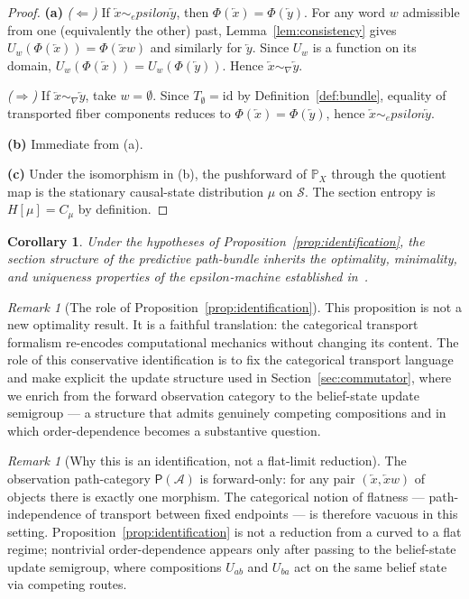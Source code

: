 \documentclass[11pt,a4paper]{article}
\def\varepsilon{epsilon}%
\theoremstyle{plain}
\newtheorem{corollary}[theorem]{Corollary}
\theoremstyle{definition}
\theoremstyle{remark}
\newtheorem{remark}[theorem]{Remark}
\newcommand{\Prob}{\mathbb{P}}
\newcommand{\PathCat}{\mathsf{P}}
\newcommand{\Alphabet}{\mathcal{A}}
\newcommand{\States}{\mathcal{S}}
\newcommand{\Past}{\overleftarrow{x}}
\begin{document}
\begin{proof}
\textbf{(a)} \emph{($\Leftarrow$)} If $\Past \sim_\varepsilon \overleftarrow{y}$, then $\Phi(\Past) = \Phi(\overleftarrow{y})$. For any word $w$ admissible from one (equivalently the other) past, Lemma~\ref{lem:consistency} gives $U_w(\Phi(\Past)) = \Phi(\Past w)$ and similarly for $\overleftarrow{y}$. Since $U_w$ is a function on its domain, $U_w(\Phi(\Past)) = U_w(\Phi(\overleftarrow{y}))$. Hence $\Past \sim_\nabla \overleftarrow{y}$.

\emph{($\Rightarrow$)} If $\Past \sim_\nabla \overleftarrow{y}$, take $w = \emptyset$. Since $T_\emptyset = \mathrm{id}$ by Definition~\ref{def:bundle}, equality of transported fiber components reduces to $\Phi(\Past) = \Phi(\overleftarrow{y})$, hence $\Past \sim_\varepsilon \overleftarrow{y}$.

\textbf{(b)} Immediate from (a).

\textbf{(c)} Under the isomorphism in (b), the pushforward of $\Prob_X$ through the quotient map is the stationary causal-state distribution $\mu$ on $\States$. The section entropy is $H[\mu] = C_\mu$ by definition.
\end{proof}

\begin{corollary}
\label{cor:inheritance}
Under the hypotheses of Proposition~\ref{prop:identification}, the section structure of the predictive path-bundle inherits the optimality, minimality, and uniqueness properties of the $\varepsilon$-machine established in~\cite{shalizi2001}.
\end{corollary}

\begin{remark}[The role of Proposition~\ref{prop:identification}]
\label{rem:role}
This proposition is not a new optimality result. It is a faithful translation: the categorical transport formalism re-encodes computational mechanics without changing its content. The role of this conservative identification is to fix the categorical transport language and make explicit the update structure used in Section~\ref{sec:commutator}, where we enrich from the forward observation category to the belief-state update semigroup --- a structure that admits genuinely competing compositions and in which order-dependence becomes a substantive question.
\end{remark}

\begin{remark}[Why this is an identification, not a flat-limit reduction]
\label{rem:forward-only}
The observation path-category $\PathCat(\Alphabet)$ is forward-only: for any pair $(\Past, \Past w)$ of objects there is exactly one morphism. The categorical notion of flatness --- path-independence of transport between fixed endpoints --- is therefore vacuous in this setting. Proposition~\ref{prop:identification} is not a reduction from a curved to a flat regime; nontrivial order-dependence appears only after passing to the belief-state update semigroup, where compositions $U_{ab}$ and $U_{ba}$ act on the same belief state via competing routes.
\end{remark}
\end{document}
